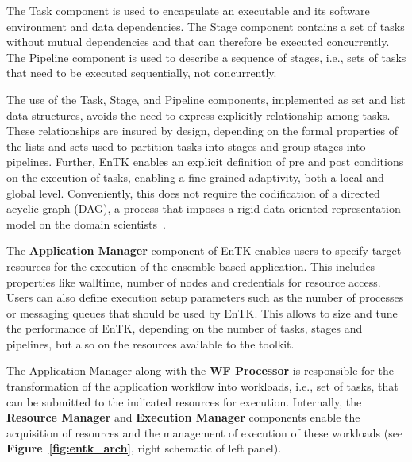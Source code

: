 The Task component is used to encapsulate an executable and its software
environment and data dependencies. The Stage component contains a set of
tasks without mutual dependencies and that can therefore be executed
concurrently. The Pipeline component is used to describe a sequence of
stages, i.e., sets of tasks that need to be executed sequentially, not
concurrently.

The use of the Task, Stage, and Pipeline components, implemented as set and
list data structures, avoids the need to express explicitly relationship
among tasks. These relationships are insured by design, depending on the
formal properties of the lists and sets used to partition tasks into stages
and group stages into pipelines. Further, EnTK enables an explicit definition
of pre and post conditions on the execution of tasks, enabling a fine grained
adaptivity, both a local and global level. Conveniently, this does not
require the codification of a directed acyclic graph (DAG), a process that
imposes a rigid data-oriented    representation model
on the domain scientists~\cite{balasubramanian2017powerofmany}.

The \textbf{Application Manager} component of EnTK enables users to specify
target resources for the execution of the ensemble-based application. This
includes properties like walltime, number of nodes and credentials for
resource access. Users can also define execution setup parameters such as the
number of processes or messaging queues that should be used by EnTK\@. This
allows to size and tune the performance of EnTK, depending on the number of
tasks, stages and pipelines, but also on the resources available to the
toolkit.

The Application Manager along with the \textbf{WF Processor} is responsible
for the transformation of the application workflow into workloads, i.e., set
of tasks, that can be submitted to the indicated resources for execution.
Internally, the \textbf{Resource Manager} and \textbf{Execution Manager}
components enable the acquisition of resources and the management of
execution of these workloads (see \textbf{Figure~\ref{fig:entk_arch}}, right
schematic of left panel).